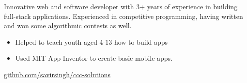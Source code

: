 \documentclass[8pt,a4paper]{altacv}
\begin{document}

\tagline{ }


\begin{fullwidth}
\makecvheader
\end{fullwidth}




Innovative web and software developer with 3+ years of experience in building full-stack applications.
Experienced in competitive programming, having written and won some algorithmic contests as well.



\begin{itemize}
\item Helped to teach youth aged 4-13 how to build apps
\item Used MIT App Inventor to create basic mobile apps.
\end{itemize}

\divider
\smallskip



\divider

\href{https://github.com/savirsingh/ccc-solutions}{github.com/savirsingh/ccc-solutions}
\end{document}
